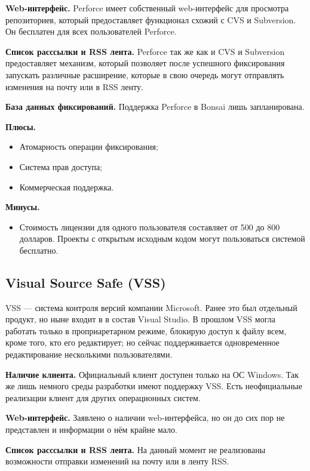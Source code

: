 \textbf{Web-интерфейс.} Perforce имеет собственный web-интерфейс для просмотра репозиториев, который предоставляет функционал схожий с CVS и Subversion. Он бесплатен для всех пользователей Perforce.

\textbf{Список расссылки и RSS лента.} Perforce так же как и CVS и Subversion предоставляет механизм, который позволяет после успешного фиксирования запускать различные расширение, которые в свою очередь могут отправлять изменения на почту или в RSS ленту.

\textbf{База данных фиксирований.} Поддержка Perforce в Bonsai лишь запланирована.

\textbf{Плюсы.}
\begin{itemize}
\item Атомарность операции фиксирования;
\item Система прав доступа;
\item Коммерческая поддержка.
\end{itemize}



\textbf{Минусы.}
\begin{itemize}
\item Стоимость лицензии для одного пользователя составляет от 500 до 800 долларов. Проекты с открытым исходным кодом могут пользоваться системой бесплатно.
\end{itemize}



\subsection{ Visual Source Safe (VSS) } \label{sect3_4_5}

VSS --- система контроля версий компании Microsoft. Ранее это был отдельный продукт, но ныне входит в в состав Visual Studio. В прошлом VSS могла работать только в проприаретарном режиме, блокирую доступ к файлу всем, кроме того, кто его редактирует; но сейчас поддерживается одновременное редактирование несколькими пользователями.

\textbf{Наличие клиента.} Официальный клиент доступен только на ОС Windows. Так же лишь немного среды разработки имеют поддержку VSS. Есть неофициальные реализации клиент для других операционных систем.

\textbf{Web-интерфейс.} Заявлено о наличии web-интерфейса, но он до сих пор не представлен и информации о нём крайне мало.

\textbf{Список расссылки и RSS лента.} На данный момент не реализованы возможности отправки изменений на почту или в ленту RSS.

